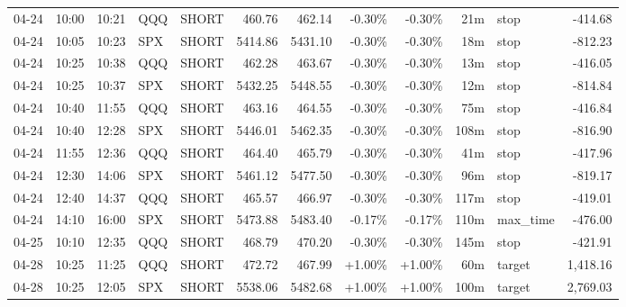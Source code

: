 \documentclass[11pt,a4paper,twoside]{article}
\begin{document}
\begin{center}
\begin{longtable}{>{\color{txtmain}}l l l l l r r r r r >{\color{txtmain}}l r}
04-24 & 10:00 & 10:21 & QQQ & SHORT & 460.76 & 462.14 & \textcolor{lossred}{-0.30\%} & \textcolor{lossred}{-0.30\%} & 21m & stop & \textcolor{lossred}{-414.68} \\
04-24 & 10:05 & 10:23 & SPX & SHORT & 5414.86 & 5431.10 & \textcolor{lossred}{-0.30\%} & \textcolor{lossred}{-0.30\%} & 18m & stop & \textcolor{lossred}{-812.23} \\
04-24 & 10:25 & 10:38 & QQQ & SHORT & 462.28 & 463.67 & \textcolor{lossred}{-0.30\%} & \textcolor{lossred}{-0.30\%} & 13m & stop & \textcolor{lossred}{-416.05} \\
04-24 & 10:25 & 10:37 & SPX & SHORT & 5432.25 & 5448.55 & \textcolor{lossred}{-0.30\%} & \textcolor{lossred}{-0.30\%} & 12m & stop & \textcolor{lossred}{-814.84} \\
04-24 & 10:40 & 11:55 & QQQ & SHORT & 463.16 & 464.55 & \textcolor{lossred}{-0.30\%} & \textcolor{lossred}{-0.30\%} & 75m & stop & \textcolor{lossred}{-416.84} \\
04-24 & 10:40 & 12:28 & SPX & SHORT & 5446.01 & 5462.35 & \textcolor{lossred}{-0.30\%} & \textcolor{lossred}{-0.30\%} & 108m & stop & \textcolor{lossred}{-816.90} \\
04-24 & 11:55 & 12:36 & QQQ & SHORT & 464.40 & 465.79 & \textcolor{lossred}{-0.30\%} & \textcolor{lossred}{-0.30\%} & 41m & stop & \textcolor{lossred}{-417.96} \\
04-24 & 12:30 & 14:06 & SPX & SHORT & 5461.12 & 5477.50 & \textcolor{lossred}{-0.30\%} & \textcolor{lossred}{-0.30\%} & 96m & stop & \textcolor{lossred}{-819.17} \\
04-24 & 12:40 & 14:37 & QQQ & SHORT & 465.57 & 466.97 & \textcolor{lossred}{-0.30\%} & \textcolor{lossred}{-0.30\%} & 117m & stop & \textcolor{lossred}{-419.01} \\
04-24 & 14:10 & 16:00 & SPX & SHORT & 5473.88 & 5483.40 & \textcolor{lossred}{-0.17\%} & \textcolor{lossred}{-0.17\%} & 110m & max\_time & \textcolor{lossred}{-476.00} \\
04-25 & 10:10 & 12:35 & QQQ & SHORT & 468.79 & 470.20 & \textcolor{lossred}{-0.30\%} & \textcolor{lossred}{-0.30\%} & 145m & stop & \textcolor{lossred}{-421.91} \\
04-28 & 10:25 & 11:25 & QQQ & SHORT & 472.72 & 467.99 & \textcolor{wingreen}{+1.00\%} & \textcolor{wingreen}{+1.00\%} & 60m & target & \textcolor{wingreen}{1,418.16} \\
04-28 & 10:25 & 12:05 & SPX & SHORT & 5538.06 & 5482.68 & \textcolor{wingreen}{+1.00\%} & \textcolor{wingreen}{+1.00\%} & 100m & target & \textcolor{wingreen}{2,769.03} \\

\end{longtable}
\end{center}
\end{document}

